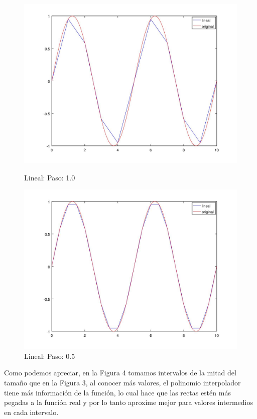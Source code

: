\begin{figure}[h]
  \begin{minipage}[b]{.5\textwidth} 
    \includegraphics[width=\textwidth]{complementos/lineal_1.jpg}
    \caption{Lineal: Paso: 1.0}
  \end{minipage}
  \begin{minipage}[b]{.5\textwidth} 
    \includegraphics[width=\textwidth]{complementos/lineal_05.jpg}
    \caption{Lineal: Paso: 0.5}
  \end{minipage}
\end{figure} \label{eq:lineal_graph}

Como podemos apreciar, en la Figura 4 tomamos intervalos de la mitad del tamaño que en la Figura 3, al conocer más valores, el polinomio interpolador tiene más información de la función, lo cual hace que las rectas estén más pegadas a la función real y por lo tanto aproxime mejor para valores intermedios en cada intervalo. 

